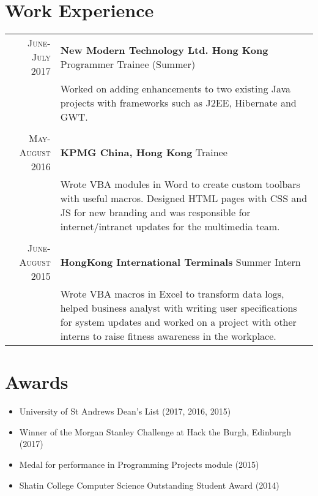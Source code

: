\documentclass{article}
\begin{document}
\section*{Work Experience}
\begin{tabular}{r|p{15cm}}

\textsc{June-July 2017} & \textbf{New Modern Technology Ltd. Hong Kong} Programmer Trainee (Summer) \\

&\footnotesize{Worked on adding enhancements to two existing Java projects with frameworks such as J2EE, Hibernate and GWT.}\\
\multicolumn{2}{c}{} \\

\textsc{May-August 2016} & \textbf{KPMG China, Hong Kong} Trainee \\
 
&\footnotesize{Wrote VBA modules in Word to create custom toolbars with useful macros. Designed HTML pages with CSS and JS for new branding and was responsible for internet/intranet updates for the multimedia team.}\\\multicolumn{2}{c}{} \\


\textsc{June-August 2015} & \textbf{HongKong International Terminals} Summer Intern\\

&\footnotesize{Wrote VBA macros in Excel to transform data logs, helped business analyst with writing user specifications for system updates and worked on a project with other interns to raise fitness awareness in the workplace.}\\

\end{tabular}

\section*{Awards}
\setlength\multicolsep{0pt}
\begin{multicols}{2}
\begin{itemize}
\item University of St Andrews Dean's List (2017, 2016, 2015)
\item Winner of the Morgan Stanley Challenge at Hack the Burgh, Edinburgh (2017)
\end{itemize}
\columnbreak
\begin{itemize}
\item Medal for performance in Programming Projects module (2015)
\item Shatin College Computer Science Outstanding Student Award (2014)
\end{itemize}%
\end{multicols}
\end{document}
